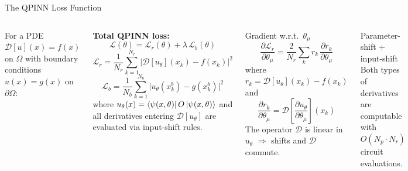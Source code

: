 \documentclass[aspectratio=169,10pt]{beamer}
\begin{document}
\begin{frame}{The QPINN Loss Function}
  \begin{columns}[T]
      For a PDE $\mathcal{D}[u](x) = f(x)$ on $\Omega$
      with boundary conditions $u(x) = g(x)$ on $\partial\Omega$:

      \textbf{Total QPINN loss:}
      \[
        \mathcal{L}(\theta)
        = \mathcal{L}_r(\theta) + \lambda\,\mathcal{L}_b(\theta)
      \]
      \[
        \mathcal{L}_r = \frac{1}{N_r}\sum_{k=1}^{N_r}
          \bigl|\mathcal{D}[u_\theta](x_k) - f(x_k)\bigr|^2
      \]
      \[
        \mathcal{L}_b = \frac{1}{N_b}\sum_{k=1}^{N_b}
          \bigl|u_\theta(x_k^b) - g(x_k^b)\bigr|^2
      \]
      where $u_\theta(x) = \bra{\psi(x,\theta)}O\ket{\psi(x,\theta)}$
      and all derivatives entering $\mathcal{D}[u_\theta]$ are
      evaluated via input-shift rules.
      \begin{block}{Gradient w.r.t.\ $\theta_\mu$}
        \[
          \frac{\partial\mathcal{L}_r}{\partial\theta_\mu}
          = \frac{2}{N_r}\sum_k r_k\,
            \frac{\partial r_k}{\partial\theta_\mu}
        \]
        where $r_k = \mathcal{D}[u_\theta](x_k) - f(x_k)$
        and
        \[
          \frac{\partial r_k}{\partial\theta_\mu}
          = \mathcal{D}\!\left[
              \frac{\partial u_\theta}{\partial\theta_\mu}
            \right](x_k)
        \]
        The operator $\mathcal{D}$ is linear in $u_\theta$
        $\Rightarrow$ shifts and $\mathcal{D}$ commute.
      \end{block}
      \begin{alertblock}{Parameter-shift + input-shift}
        Both types of derivatives are computable with
        $O(N_p\cdot N_r)$ circuit evaluations.
      \end{alertblock}
  \end{columns}
\end{frame}
\end{document}
